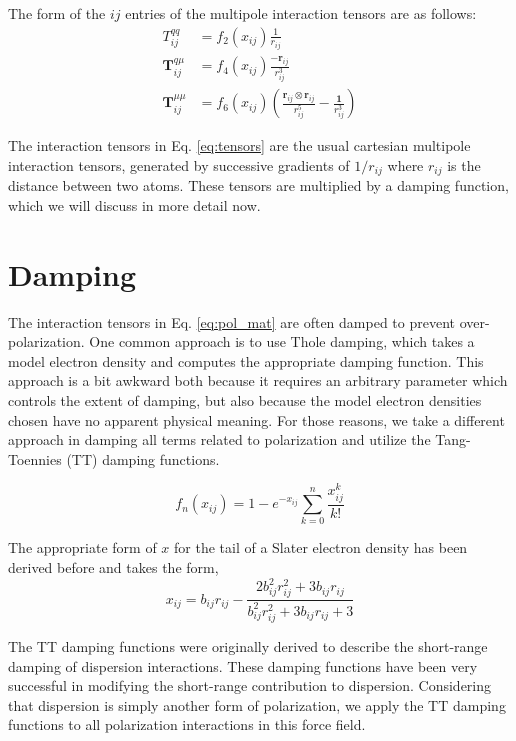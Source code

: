 \documentclass[journal=jacsat,manuscript=article]{achemso}
\begin{document}
The form of the $ij$ entries of the multipole interaction tensors are as follows:
\begin{align}
  T^{qq}_{ij}&=f_2(x_{ij})\frac{1}{r_{ij}} \\
  \bm{T}^{q\mu}_{ij}&=f_4(x_{ij})\frac{-\bm{r}_{ij}}{r_{ij}^3} \\
  \bm{T}^{\mu\mu}_{ij}&=f_6(x_{ij})\left(\frac{\bm{r}_{ij}\otimes\bm{r}_{ij}}{r_{ij}^5}-\frac{\bm{1}}{r_{ij}^3}\right)
  \label{eq:tensors}
\end{align}

The interaction tensors in Eq. \ref{eq:tensors} are the usual cartesian multipole interaction
tensors, generated by successive gradients of $1/r_{ij}$ where $r_{ij}$ is the distance between
two atoms. These tensors are multiplied by a damping function, which we will discuss in more detail
now.

\section*{Damping}

The interaction tensors in Eq. \ref{eq:pol_mat} are often
damped to prevent over-polarization. One common approach is to use Thole damping\cite{thole1981molecular},
which takes a model electron density and computes the appropriate damping function. This approach is
a bit awkward both because it requires an arbitrary parameter which controls the extent of damping,
but also because the model electron densities chosen have no apparent physical meaning.
For those reasons, we take a different approach in damping all terms related to polarization and
utilize the Tang-Toennies (TT) damping functions\cite{tang1984improved}.

\begin{equation}
  f_n(x_{ij}) = 1-e^{-x_{ij}}\sum_{k=0}^n\frac{x_{ij}^k}{k!}
  \label{eq:TT}
\end{equation}

The appropriate form of $x$ for the tail of a Slater electron density
has been derived before\cite{van2016beyond} and takes the form,
\begin{equation}
  x_{ij}=b_{ij}r_{ij}-\frac{2b_{ij}^2r_{ij}^2+3b_{ij}r_{ij}}{b_{ij}^2r_{ij}^2+3b_{ij}r_{ij}+3}
  \label{eq:TT_x}
\end{equation}

The TT damping functions were originally derived to describe the short-range damping
of dispersion interactions. These damping functions have been very successful in
modifying the short-range contribution to dispersion. Considering that dispersion is
simply another form of polarization, we apply the TT damping functions to all
polarization interactions in this force field.
\end{document}
